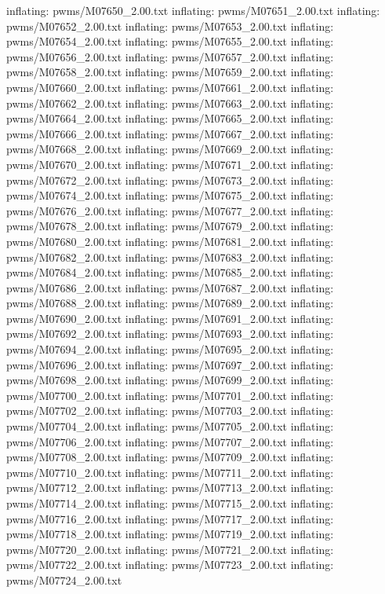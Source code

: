 \documentclass[letterpaper,10pt,english]{sphinxmanual}
\begin{document}
{\begin{sphinxVerbatim}[commandchars=\\\{\}]
  inflating: pwms/M07650\_2.00.txt
  inflating: pwms/M07651\_2.00.txt
  inflating: pwms/M07652\_2.00.txt
  inflating: pwms/M07653\_2.00.txt
  inflating: pwms/M07654\_2.00.txt
  inflating: pwms/M07655\_2.00.txt
  inflating: pwms/M07656\_2.00.txt
  inflating: pwms/M07657\_2.00.txt
  inflating: pwms/M07658\_2.00.txt
  inflating: pwms/M07659\_2.00.txt
  inflating: pwms/M07660\_2.00.txt
  inflating: pwms/M07661\_2.00.txt
  inflating: pwms/M07662\_2.00.txt
  inflating: pwms/M07663\_2.00.txt
  inflating: pwms/M07664\_2.00.txt
  inflating: pwms/M07665\_2.00.txt
  inflating: pwms/M07666\_2.00.txt
  inflating: pwms/M07667\_2.00.txt
  inflating: pwms/M07668\_2.00.txt
  inflating: pwms/M07669\_2.00.txt
  inflating: pwms/M07670\_2.00.txt
  inflating: pwms/M07671\_2.00.txt
  inflating: pwms/M07672\_2.00.txt
  inflating: pwms/M07673\_2.00.txt
  inflating: pwms/M07674\_2.00.txt
  inflating: pwms/M07675\_2.00.txt
  inflating: pwms/M07676\_2.00.txt
  inflating: pwms/M07677\_2.00.txt
  inflating: pwms/M07678\_2.00.txt
  inflating: pwms/M07679\_2.00.txt
  inflating: pwms/M07680\_2.00.txt
  inflating: pwms/M07681\_2.00.txt
  inflating: pwms/M07682\_2.00.txt
  inflating: pwms/M07683\_2.00.txt
  inflating: pwms/M07684\_2.00.txt
  inflating: pwms/M07685\_2.00.txt
  inflating: pwms/M07686\_2.00.txt
  inflating: pwms/M07687\_2.00.txt
  inflating: pwms/M07688\_2.00.txt
  inflating: pwms/M07689\_2.00.txt
  inflating: pwms/M07690\_2.00.txt
  inflating: pwms/M07691\_2.00.txt
  inflating: pwms/M07692\_2.00.txt
  inflating: pwms/M07693\_2.00.txt
  inflating: pwms/M07694\_2.00.txt
  inflating: pwms/M07695\_2.00.txt
  inflating: pwms/M07696\_2.00.txt
  inflating: pwms/M07697\_2.00.txt
  inflating: pwms/M07698\_2.00.txt
  inflating: pwms/M07699\_2.00.txt
  inflating: pwms/M07700\_2.00.txt
  inflating: pwms/M07701\_2.00.txt
  inflating: pwms/M07702\_2.00.txt
  inflating: pwms/M07703\_2.00.txt
  inflating: pwms/M07704\_2.00.txt
  inflating: pwms/M07705\_2.00.txt
  inflating: pwms/M07706\_2.00.txt
  inflating: pwms/M07707\_2.00.txt
  inflating: pwms/M07708\_2.00.txt
  inflating: pwms/M07709\_2.00.txt
  inflating: pwms/M07710\_2.00.txt
  inflating: pwms/M07711\_2.00.txt
  inflating: pwms/M07712\_2.00.txt
  inflating: pwms/M07713\_2.00.txt
  inflating: pwms/M07714\_2.00.txt
  inflating: pwms/M07715\_2.00.txt
  inflating: pwms/M07716\_2.00.txt
  inflating: pwms/M07717\_2.00.txt
  inflating: pwms/M07718\_2.00.txt
  inflating: pwms/M07719\_2.00.txt
  inflating: pwms/M07720\_2.00.txt
  inflating: pwms/M07721\_2.00.txt
  inflating: pwms/M07722\_2.00.txt
  inflating: pwms/M07723\_2.00.txt
  inflating: pwms/M07724\_2.00.txt

\end{sphinxVerbatim}}
\end{document}
